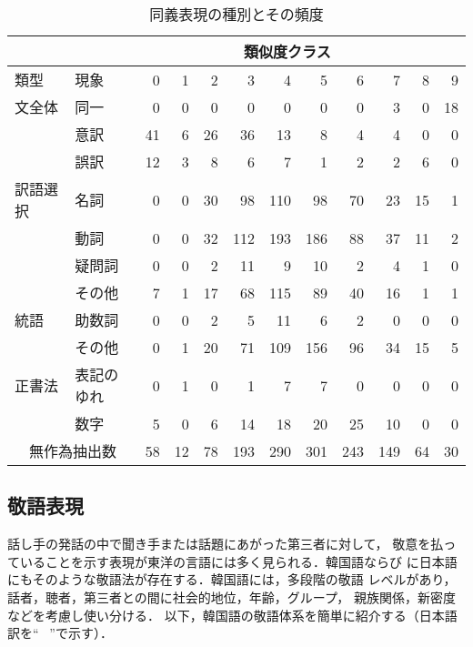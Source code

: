 \begin{table*}[tb]
\caption{同義表現の種別とその頻度}
\label{tab:para}
\begin{center}
\begin{tabular}{ll|rrrrrrrrrr}
\hline\hline
& & \multicolumn{9}{c}{類似度クラス}\\
\hline
類型& 現象 & 0 & 1 & 2 & 3 & 4& 5&6&7&8 &9\\
 \hline
文全体& 同一 & 0 &0 &  0 &  0 &  0 & 0 & 0 & 3 & 0 & 18\\
      & 意訳 & 41 &6 & 26 & 36 & 13 & 8 & 4 & 4 & 0 & 0\\
      & 誤訳 & 12 &3 & 8  & 6  & 7  & 1 & 2 & 2 & 6 & 0\\
\hline
訳語選択&名詞    & 0 & 0 & 30 & 98& 110& 98& 70& 23& 15& 1\\
        &動詞    & 0 & 0 & 32 & 112 & 193 & 186 & 88 & 37 & 11 & 2\\
        & 疑問詞 & 0 & 0 & 2 & 11 & 9 & 10 & 2 & 4 & 1 & 0 \\
        & その他 & 7 & 1 & 17 & 68 & 115 & 89 & 40 & 16 & 1 & 1\\
\hline
統語&助数詞 & 0 & 0 & 2 & 5 & 11 & 6 & 2 & 0 & 0 & 0\\
    & その他& 0 & 1 & 20 & 71 & 109 & 156 & 96 & 34 & 15 & 5\\
\hline
正書法&表記のゆれ& 0 & 1 & 0 & 1 & 7 & 7 & 0 & 0 & 0 & 0\\
      &数字      & 5 & 0 & 6 & 14 & 18 & 20 & 25 & 10 & 0 & 0\\
 \hline
\multicolumn{2}{c|}{無作為抽出数} & 58 & 12 & 78 & 193 & 290 & 301 & 243 & 149 & 64 & 30\\
\hline\hline
\end{tabular}
\end{center}
\end{table*}



\subsection{敬語表現}
\label{sec:honorific}
話し手の発話の中で聞き手または話題にあがった第三者に対して，
敬意を払っていることを示す表現が東洋の言語には多く見られる．韓国語ならび
に日本語にもそのような敬語法が存在する．韓国語には，多段階の敬語
レベルがあり，話者，聴者，第三者との間に社会的地位，年齢，グループ，
親族関係，新密度などを考慮し使い分ける\cite{Sohn:1999}．
以下，韓国語の敬語体系を簡単に紹介する（日本語訳を``~ ''で示す）．

